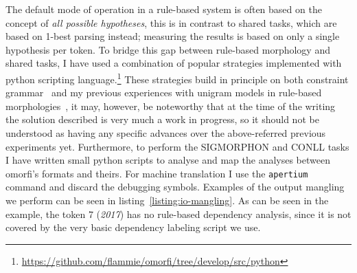 \documentclass{flammie}
\begin{document}
The default mode of operation in a rule-based system is often based on the
concept of \textit{all possible hypotheses}, this is in contrast to shared
tasks, which are based on 1-best parsing instead; measuring the results is based
on only a single hypothesis per token. To bridge this gap between rule-based
morphology and shared tasks, I have used a combination of popular strategies
implemented with python scripting
language.\footnote{\url{https://github.com/flammie/omorfi/tree/develop/src/python}}
These strategies build in principle on both constraint
grammar~\citep{karlsson1990constraint,pirinen2015using} and my previous
experiences with unigram models in rule-based
morphologies~\citep{pirinen2009weighting}, it may, however, be noteworthy that
at the time of the writing the solution described is very much a work in
progress, so it should not be understood as having any specific advances over
the above-referred previous experiments yet.  Furthermore, to perform the
SIGMORPHON and CONLL tasks I have written small python scripts to analyse and
map the analyses between omorfi's formats and theirs.  For machine translation I
use the \texttt{apertium} command and discard the debugging symbols. Examples of
the output mangling we perform can be seen in listing~\ref{listing:io-mangling}.
As can be seen in the example, the token 7 (\textit{2017}) has no rule-based
dependency analysis, since it is not covered by the very basic dependency
labeling script we use.
\end{document}

